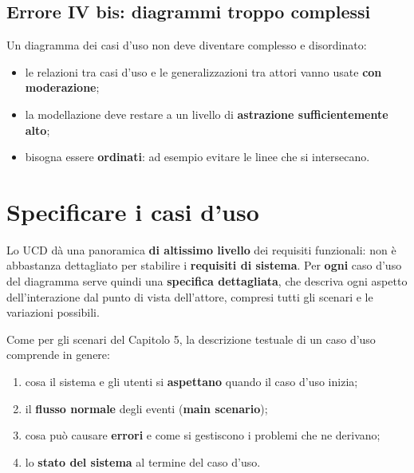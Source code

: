 \subsection{Errore IV bis: diagrammi troppo complessi}

Un diagramma dei casi d'uso non deve diventare complesso e disordinato:
\begin{itemize}
  \item le relazioni tra casi d'uso e le generalizzazioni tra attori vanno usate \textbf{con moderazione};
  \item la modellazione deve restare a un livello di \textbf{astrazione sufficientemente alto};
  \item bisogna essere \textbf{ordinati}: ad esempio evitare le linee che si intersecano.
\end{itemize}


\section{Specificare i casi d'uso}

Lo UCD dà una panoramica \textbf{di altissimo livello} dei requisiti funzionali: non è abbastanza dettagliato per stabilire i
\textbf{requisiti di sistema}. Per \textbf{ogni} caso d'uso del diagramma serve quindi una \textbf{specifica dettagliata}, che descriva
ogni aspetto dell'interazione dal punto di vista dell'attore, compresi tutti gli scenari e le variazioni possibili.

Come per gli scenari del Capitolo 5, la descrizione testuale di un caso d'uso comprende in genere:
\begin{enumerate}
  \item cosa il sistema e gli utenti si \textbf{aspettano} quando il caso d'uso inizia;
  \item il \textbf{flusso normale} degli eventi (\textbf{main scenario});
  \item cosa può causare \textbf{errori} e come si gestiscono i problemi che ne derivano;
  \item lo \textbf{stato del sistema} al termine del caso d'uso.
\end{enumerate}

